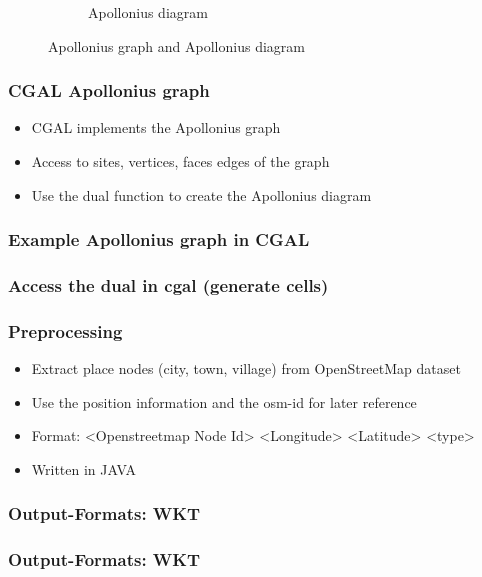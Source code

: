 \documentclass{beamer}
\begin{document}
\begin{frame}
\begin{figure}[htp]
\begin{subfigure}[b]{0.48\textwidth}
                    \caption{Apollonius diagram}
                    \label{fig:apo-diagram}
            \end{subfigure}
            \caption{Apollonius graph and Apollonius diagram}\label{fig:apollonius}
    \end{figure}
\end{frame}

\begin{frame}
    \frametitle{CGAL Apollonius graph}
    \begin{itemize}
        \item CGAL implements the Apollonius graph
        \item Access to sites, vertices, faces edges of the graph
        \item Use the dual function to create the Apollonius diagram
    \end{itemize}
\end{frame}

\begin{frame}
    \frametitle{Example Apollonius graph in CGAL}
    
\end{frame}

\begin{frame}
    \frametitle{Access the dual in cgal (generate cells)}
    
\end{frame}

\begin{frame}
    \frametitle{Preprocessing}
    \begin{itemize}
        \item Extract place nodes (city, town, village) from OpenStreetMap dataset 
        \item Use the position information and the osm-id for later reference
        \item Format: <Openstreetmap Node Id> <Longitude> <Latitude> <type>
        \item Written in JAVA
    \end{itemize}
\end{frame}

\begin{frame}
    \frametitle{Output-Formats: WKT}
    
\end{frame}

\begin{frame}
    \frametitle{Output-Formats: WKT}
    
\end{frame}
\end{document}
